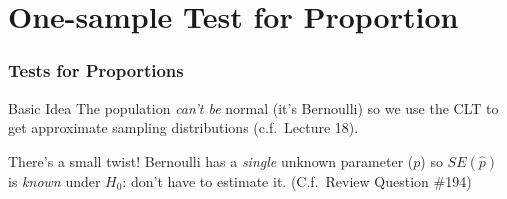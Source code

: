 \section{One-sample Test for Proportion}
\begin{frame}
	\frametitle{Tests for Proportions}
	\begin{block}
		{Basic Idea}
		The population \emph{can't be} normal (it's Bernoulli) so we use the CLT to get approximate sampling distributions (c.f.\ Lecture 18).
	\end{block}
	\begin{alertblock}
		{There's a small twist!}
    Bernoulli has a \emph{single} unknown parameter ($p$) so $SE(\widehat{p})$ is \emph{known} under $H_0$: don't have to estimate it.
    (C.f.\ Review Question \#194)
	\end{alertblock}


\end{frame}

